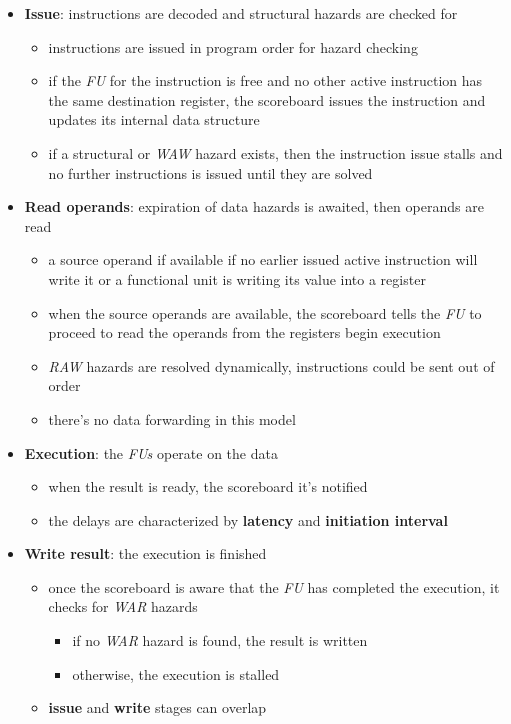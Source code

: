 \documentclass[english]{article}
\begin{document}
\begin{itemize}
  \item \textbf{Issue}: instructions are decoded and structural hazards are checked for
        \begin{itemize}
          \item instructions are issued in program order for hazard checking
          \item if the \textit{FU} for the instruction is free and no other active instruction has the same destination register, the scoreboard issues the instruction and updates its internal data structure
          \item if a structural or \textit{WAW} hazard exists, then the instruction issue stalls and no further instructions is issued until they are solved
        \end{itemize}
  \item \textbf{Read operands}: expiration of data hazards is awaited, then operands are read
        \begin{itemize}
          \item a source operand if available if no earlier issued active instruction will write it or a functional unit is writing its value into a register
          \item when the source operands are available, the scoreboard tells the \textit{FU} to proceed to read the operands from the registers begin execution
          \item \textit{RAW} hazards are resolved dynamically, instructions could be sent out of order
          \item there's no data forwarding in this model
        \end{itemize}
  \item \textbf{Execution}: the \textit{FUs} operate on the data
        \begin{itemize}
          \item when the result is ready, the scoreboard it's notified
          \item the delays are characterized by \textbf{latency} and \textbf{initiation interval}
        \end{itemize}
  \item \textbf{Write result}: the execution is finished
        \begin{itemize}
          \item once the scoreboard is aware that the \textit{FU} has completed the execution, it checks for \textit{WAR} hazards
                \begin{itemize}
                  \item if no \textit{WAR} hazard is found, the result is written
                  \item otherwise, the execution is stalled
                \end{itemize}
          \item \textbf{issue} and \textbf{write} stages can overlap
        \end{itemize}
\end{itemize}
\end{document}
